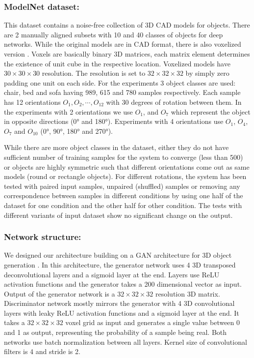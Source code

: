 \documentclass[runningheads]{llncs}
\begin{document}
\subsubsection{ModelNet dataset:} This dataset contains a noise-free collection of 3D CAD models for objects. There are 2 manually aligned subsets with 10 and 40 classes of objects for deep networks. While the original models are in CAD format, there is also voxelized version \cite{wu20153d}. Voxels are basically binary 3D matrices, each matrix element determines the existence of unit cube in the respective location. Voxelized models have $30 \times 30 \times 30$ resolution. The resolution is set to $32 \times 32 \times 32$ by simply zero padding one unit on each side. For the experiments 3 object classes are used: chair, bed and sofa having 989, 615 and 780 samples respectively. Each sample has 12 orientations $O_1,O_2,\dotsb,O_{12}$ with 30 degrees of rotation between them. In the experiments with 2 orientations we use $O_1$, and $O_7$ which represent the object in opposite directions (\ang{0} and \ang{180}). Experiments with 4 orientations use $O_1$, $O_4$, $O_7$ and $O_{10}$ (\ang{0}, \ang{90}, \ang{180} and \ang{270}).

While there are more object classes in the dataset, either they do not have sufficient number of training samples for the system to converge (less than 500) or objects are highly symmetric such that different orientations come out as same models (round or rectangle objects). For different rotations, the system has been tested with paired input samples, unpaired (shuffled) samples or removing any correspondence between samples in different conditions by using one half of the dataset for one condition and the other half for other condition. The tests with different variants of input dataset show no significant change on the output. 

\subsubsection{Network structure:} We designed our architecture building on a GAN architecture for 3D object generation \cite{smith2017improved}. In this architecture, the generator network uses 4 3D transposed deconvolutional layers and a sigmoid layer at the end. Layers use ReLU activation functions and the generator takes a 200 dimensional vector as input. Output of the generator network is a $32 \times 32 \times 32$ resolution 3D matrix. Discriminator network mostly mirrors the generator with 4 3D convolutional layers with leaky ReLU activation functions and a sigmoid layer at the end. It takes a $32 \times 32 \times 32$ voxel grid as input and generates a single value between 0 and 1 as output, representing the probability of a sample being real. Both networks use batch normalization between all layers. Kernel size of convolutional filters is 4 and stride is 2.
\end{document}
